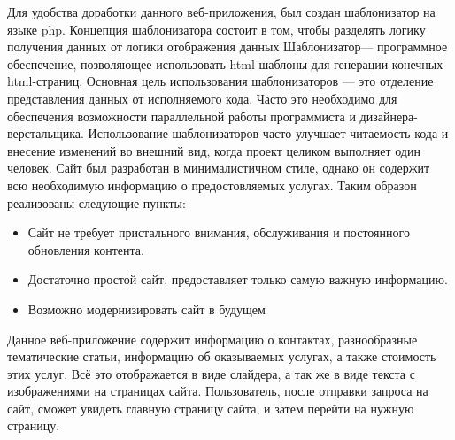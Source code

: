 \hspace{1.25cm} Для удобства доработки данного веб-приложения, был создан шаблонизатор на языке php.
Концепция шаблонизатора состоит в том, чтобы разделять логику получения данных от логики отображения данных
 Шаблонизатор— программное обеспечение, позволяющее использовать html-шаблоны для генерации конечных html-страниц. Основная цель использования шаблонизаторов — это отделение представления данных от исполняемого кода. 		Часто это необходимо для обеспечения возможности параллельной работы программиста и дизайнера-верстальщика. Использование шаблонизаторов часто улучшает читаемость кода и внесение изменений во внешний вид, когда проект целиком 	выполняет один человек.
Сайт был разработан  в минималистичном стиле, однако он содержит всю необходимую информацию о предостовляемых услугах. Таким образон реализованы следующие пункты:
\begin{itemize}
	\item Сайт не требует пристального внимания, обслуживания и постоянного обновления контента.
	\item Достаточно простой сайт, предоставляет только самую важную информацию.
	\item Возможно модернизировать сайт в будущем
\end{itemize}
Данное веб-приложение содержит информацию о контактах, разнообразные тематические статьи, информацию об оказываемых услугах, а также стоимость этих услуг.
Всё это отображается в виде слайдера, а так же в виде текста с изображениями на страницах сайта.
Пользователь,  после отправки запроса на сайт, сможет увидеть главную страницу сайта, и затем перейти на нужную страницу.